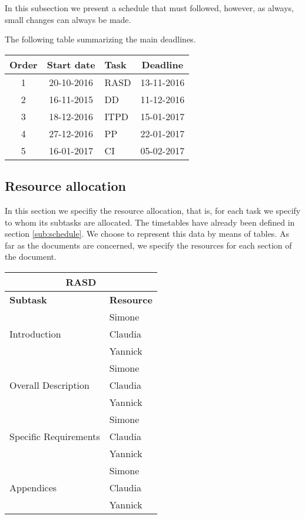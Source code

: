 In this subsection we present a schedule that must followed, however, as always, small changes can always be made.



%
%
%
%
%
%
%
%
%
%
%
%

The following table summarizing the main deadlines.

\begin{center}
\begin{tabular}{ |c|c|l|c| } \hline
	\textbf{Order} & \textbf{Start date} & \textbf{Task} & \textbf{Deadline} \\ \hline
	1 & 20-10-2016 & RASD & 13-11-2016 \\ \hline
	2 & 16-11-2015 & DD & 11-12-2016 \\ \hline
	3 & 18-12-2016 & ITPD & 15-01-2017 \\ \hline
	4 & 27-12-2016 & PP & 22-01-2017 \\ \hline
	5 & 16-01-2017 & CI & 05-02-2017 \\ \hline
\end{tabular}
\end{center}

\subsection{Resource allocation}
In this section we specifiy the resource allocation, that is, for each task we specify to whom its subtasks are allocated. The timetables have already been defined in section \ref{sub:schedule}.
We choose to represent this data by means of tables. As far as the documents are concerned, we specify the resources for each section of the document.  

\begin{center}
\begin{tabular}{ |l|l| }
	\multicolumn{2}{c}{\textbf{RASD}} \\ \hline
	\textbf{Subtask} & \textbf{Resource} \\ \hline
	\multirow{3}{*}{Introduction} & Simone \\
										& Claudia \\
										& Yannick \\ \hline
	\multirow{3}{*}{Overall Description} & Simone \\
										& Claudia \\
										& Yannick \\ \hline
	\multirow{3}{*}{Specific Requirements} & Simone \\
										& Claudia \\
										& Yannick \\ \hline
	\multirow{3}{*}{Appendices} & Simone \\ 
				& Claudia \\
				& Yannick \\ \hline

\end{tabular}
\end{center}

